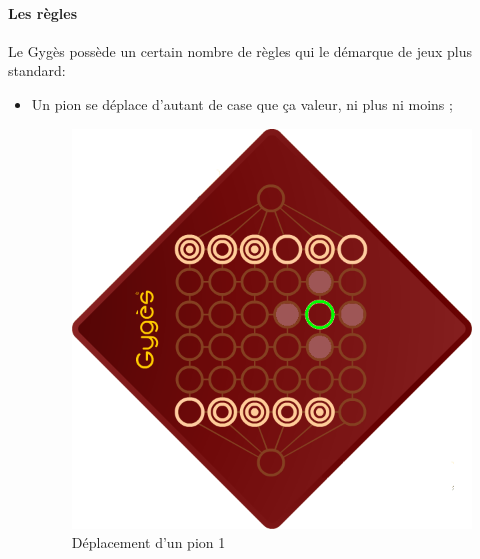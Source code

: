 \documentclass[a4paper]{article}
\begin{document}
		\paragraph{Les règles} Le Gygès possède un certain nombre de règles qui le démarque de jeux plus
		\og{}standard\fg{}:
			\begin{itemize}
				\item Un pion se déplace d'autant de case que ça valeur, ni plus ni moins ;

				\begin{figure}[ht]
					\centering
					\begin{minipage}[b]{0.28\linewidth}
					\centering
					\includegraphics[width=\textwidth]{move1.png}
					\caption{Déplacement d'un pion 1}
					\label{fig:figure1}
					\end{minipage}
					\hspace{0.5cm}
					\begin{minipage}[b]{0.28\linewidth}
					\centering

\end{minipage}
\end{figure}
\end{itemize}
\end{document}
